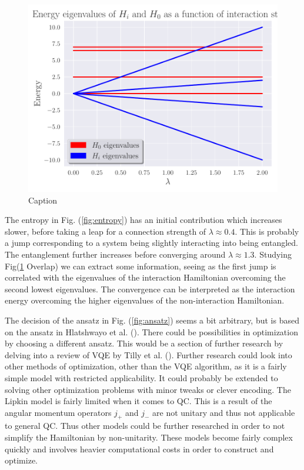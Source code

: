 \begin{figure}
    \centering
    \includegraphics[scale=0.4]{figs/Eig_lmd.pdf}
    \caption{Caption}
    \label{fig:eig_lmd}
\end{figure}
The entropy in Fig. (\ref{fig:entropy}) has an initial contribution which increases slower, before taking a leap for a connection strength of $\lambda \approx 0.4$. This is probably a jump corresponding to a system being slightly interacting into being entangled. The entanglement further increases before converging around $\lambda \approx 1.3$. Studying Fig(\ref{fig:eig_lmd} Overlap) we can extract some information, seeing as the first jump is correlated with the eigenvalues of the interaction Hamiltonian overcoming the second lowest eigenvalues. The convergence can be interpreted as the interaction energy overcoming the higher eigenvalues of the non-interaction Hamiltonian.
\newline\newline

The decision of the ansatz in Fig. (\ref{fig:ansatz}) seems a bit arbitrary, but is based on the ansatz in Hlatshwayo et al. (\cite{hlatshwayoSimulatingExcitedStates2022}). There could be possibilities in optimization by choosing a different ansatz. This would be a section of further research by delving into a review of VQE by Tilly et al. (\cite{VQE_review}). \newline 
Further research could look into other methods of optimization, other than the VQE algorithm, as it is a fairly simple model with restricted applicability. It could probably be extended to solving other optimization problems with minor tweaks or clever encoding. The Lipkin model is fairly limited when it comes to QC. This is a result of the angular momentum operators $j_+$ and $j_-$ are not unitary and thus not applicable to general QC. Thus other models could be further researched in order to not simplify the Hamiltonian by non-unitarity. These models become fairly complex quickly and involves heavier computational costs in order to construct and optimize.  
